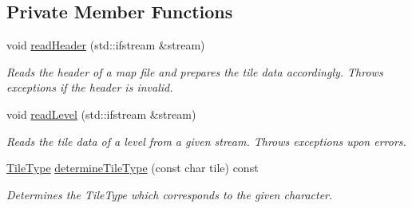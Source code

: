 \subsection*{Private Member Functions}
\begin{DoxyCompactItemize}
\item 
void \hyperlink{classLevelData_a68e8ac8397ac430ebd28f3db2cd2020a}{read\+Header} (std\+::ifstream \&stream)
\begin{DoxyCompactList}\small\item\em Reads the header of a map file and prepares the tile data accordingly. Throws exceptions if the header is invalid. \end{DoxyCompactList}\item 
void \hyperlink{classLevelData_ad9e4687d526e6b503617338279aabb33}{read\+Level} (std\+::ifstream \&stream)
\begin{DoxyCompactList}\small\item\em Reads the tile data of a level from a given stream. Throws exceptions upon errors. \end{DoxyCompactList}\item 
\hyperlink{LevelData_8hpp_a47dee72188473c57343127b1a5843398}{Tile\+Type} \hyperlink{classLevelData_a22aa59bed8da92af1921066eeef30a19}{determine\+Tile\+Type} (const char tile) const 
\begin{DoxyCompactList}\small\item\em Determines the Tile\+Type which corresponds to the given character. \end{DoxyCompactList}\end{DoxyCompactItemize}

